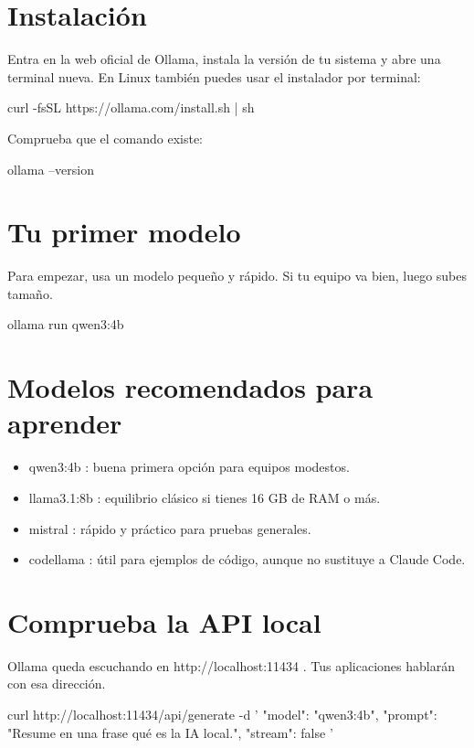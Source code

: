 \documentclass[11pt,a4paper]{book}
\begin{document}
\section{Instalación}
Entra en la web oficial de Ollama, instala la versión de tu sistema y abre una terminal nueva. En Linux también puedes usar el instalador por terminal:

\begin{codebox}
curl -fsSL https://ollama.com/install.sh | sh
\end{codebox}
Comprueba que el comando existe:

\begin{codebox}
ollama --version
\end{codebox}
\section{Tu primer modelo}
Para empezar, usa un modelo pequeño y rápido. Si tu equipo va bien, luego subes tamaño.

\begin{codebox}
ollama run qwen3:4b
\end{codebox}
\section{Modelos recomendados para aprender}
\begin{itemize}\item qwen3:4b : buena primera opción para equipos modestos.\end{itemize}
\begin{itemize}\item llama3.1:8b : equilibrio clásico si tienes 16 GB de RAM o más.\end{itemize}
\begin{itemize}\item mistral : rápido y práctico para pruebas generales.\end{itemize}
\begin{itemize}\item codellama : útil para ejemplos de código, aunque no sustituye a Claude Code.\end{itemize}
\section{Comprueba la API local}
Ollama queda escuchando en http://localhost:11434 . Tus aplicaciones hablarán con esa dirección.

\begin{codebox}
curl http://localhost:11434/api/generate -d '{
  "model": "qwen3:4b",
  "prompt": "Resume en una frase qué es la IA local.",
  "stream": false
}'
\end{codebox}
\end{document}
